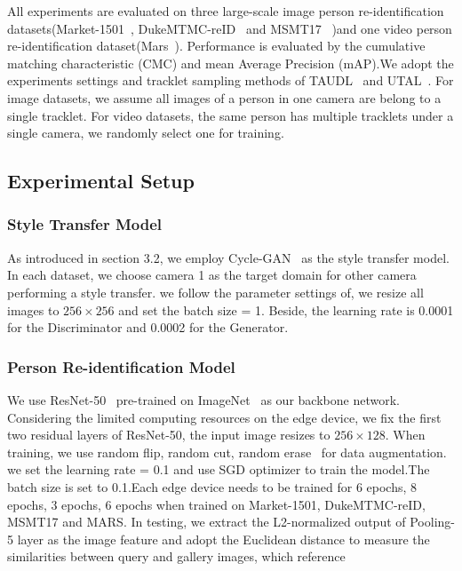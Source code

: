 \documentclass{article}
\begin{document}
All experiments are evaluated on three large-scale image person re-identification datasets(Market-1501~\cite{zheng2015scalable}, DukeMTMC-reID~\cite{ristani2016performance,zheng2017unlabeled} and MSMT17~\cite{wei2018person} )and one video person re-identification dataset(Mars~\cite{zheng2016mars}). Performance is evaluated by the cumulative matching characteristic (CMC) and mean Average Precision (mAP).We adopt the experiments settings and tracklet sampling methods of TAUDL~\cite{li2018unsupervised} and UTAL~\cite{li2019unsupervised}.  For image datasets, we assume all images of a person in one camera are belong to a single tracklet. For video datasets,  the same person has multiple tracklets under a single camera, we randomly select one for training.


\subsection{Experimental Setup}


\subsubsection{Style Transfer Model}
As introduced in section 3.2,  we employ Cycle-GAN~\cite{zhu2017unpaired} as the style transfer model. In each dataset, we choose camera 1 as the target domain for other camera performing a style transfer. we follow the parameter settings of, we resize all images to $256\times 256$ and set the batch size = 1. Beside, the learning rate is 0.0001 for the Discriminator and 0.0002 for the Generator.

\subsubsection{Person Re-identification Model}
We use ResNet-50~\cite{he2016deep} pre-trained on ImageNet~\cite{deng2009imagenet} as our backbone network. Considering the limited computing resources on the edge device, we fix the first two residual layers of ResNet-50, the input image resizes to $256\times128$. When training, we use random flip, random cut, random erase~\cite{zhong2017random} for data augmentation. we set the learning rate = 0.1 and use SGD optimizer to train the model.The batch size is set to 0.1.Each edge device needs to be trained for 6 epochs, 8 epochs, 3 epochs, 6 epochs when trained on Market-1501, DukeMTMC-reID, MSMT17 and MARS. In testing, we extract the L2-normalized output of Pooling-5 layer as the image feature and adopt the Euclidean distance to measure the similarities between query and gallery images, which reference ~\cite{zhong2019invariance}
\end{document}
